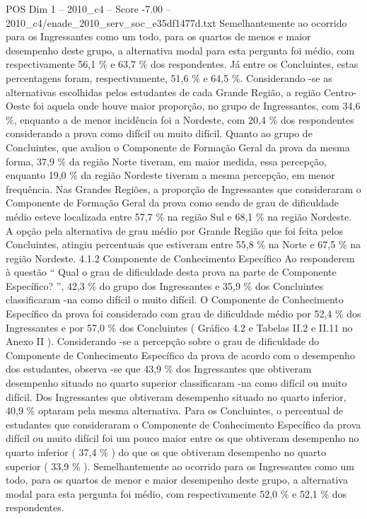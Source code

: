 \begin{textsample}{POS Dim 1 – 2010\_c4 – Score -7.00 – 2010\_c4/enade\_2010\_serv\_soc\_e35df1477d.txt}
Semelhantemente ao ocorrido para os Ingressantes como um todo, para os quartos de menos e maior desempenho deste grupo, a alternativa modal para esta pergunta foi médio, com respectivamente 56,1 \% e 63,7 \% dos respondentes.
Já entre os Concluintes, estas percentagens foram, respectivamente, 51,6 \% e 64,5 \%.
Considerando -se as alternativas escolhidas pelos estudantes de cada Grande Região, a região Centro-Oeste foi aquela onde houve maior proporção, no grupo de Ingressantes, com 34,6 \%, enquanto a de menor incidência foi a Nordeste, com 20,4 \% dos respondentes considerando a prova como difícil ou muito difícil.
Quanto ao grupo de Concluintes, que avaliou o Componente de Formação Geral da prova da mesma forma, 37,9 \% da região Norte tiveram, em maior medida, essa percepção, enquanto 19,0 \% da região Nordeste tiveram a mesma percepção, em menor frequência.
Nas Grandes Regiões, a proporção de Ingressantes que consideraram o Componente de Formação Geral da prova como sendo de grau de dificuldade médio esteve localizada entre 57,7 \% na região Sul e 68,1 \% na região Nordeste.
A opção pela alternativa de grau médio por Grande Região que foi feita pelos Concluintes, atingiu percentuais que estiveram entre 55,8 \% na Norte e 67,5 \% na região Nordeste. 4.1.2 Componente de Conhecimento Específico Ao responderem à questão “ Qual o grau de dificuldade desta prova na parte de Componente Específico? ”, 42,3 \% do grupo dos Ingressantes e 35,9 \% dos Concluintes classificaram -na como difícil o muito difícil.
O Componente de Conhecimento Específico da prova foi considerado com grau de dificuldade médio por 52,4 \% dos Ingressantes e por 57,0 \% dos Concluintes ( Gráfico 4.2 e Tabelas II.2 e II.11 no Anexo II ).
Considerando -se a percepção sobre o grau de dificuldade do Componente de Conhecimento Específico da prova de acordo com o desempenho dos estudantes, observa -se que 43,9 \% dos Ingressantes que obtiveram desempenho situado no quarto superior classificaram -na como difícil ou muito difícil.
Dos Ingressantes que obtiveram desempenho situado no quarto inferior, 40,9 \% optaram pela mesma alternativa.
Para os Concluintes, o percentual de estudantes que consideraram o Componente de Conhecimento Específico da prova difícil ou muito difícil foi um pouco maior entre os que obtiveram desempenho no quarto inferior ( 37,4 \% ) do que os que obtiveram desempenho no quarto superior ( 33,9 \% ).
Semelhantemente ao ocorrido para os Ingressantes como um todo, para os quartos de menor e maior desempenho deste grupo, a alternativa modal para esta pergunta foi médio, com respectivamente 52,0 \% e 52,1 \% dos respondentes.

\end{textsample}
